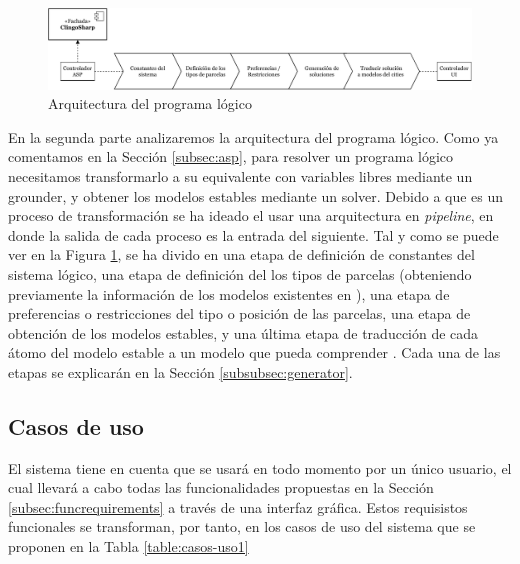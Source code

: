\begin{figure}[!h]
	\centering
	\includegraphics[width=\textwidth]{images/arquitectura-asp}
	\caption{Arquitectura del programa lógico}
	\label{fig:arquitectura-asp}
\end{figure}

En la segunda parte analizaremos la arquitectura del programa lógico. Como ya comentamos en la Sección \ref{subsec:asp}, para resolver un programa lógico necesitamos transformarlo a su equivalente con variables libres mediante un grounder, y obtener los modelos estables mediante un solver. Debido a que es un proceso de transformación se ha ideado el usar una arquitectura en \textit{pipeline}, en donde la salida de cada proceso es la entrada del siguiente. Tal y como se puede ver en la Figura \ref{fig:arquitectura-asp}, se ha divido en una etapa de definición de constantes del sistema lógico, una etapa de definición del los tipos de parcelas (obteniendo previamente la información de los modelos existentes en \cities), una etapa de preferencias o restricciones del tipo o posición de las parcelas, una etapa de obtención de los modelos estables, y una última etapa de traducción de cada átomo del modelo estable a un modelo que pueda comprender \cities. Cada una de las etapas se explicarán en la Sección \ref{subsubsec:generator}.

\subsection{Casos de uso}
\label{subsec:cases}

El sistema tiene en cuenta que se usará en todo momento por un único usuario, el cual llevará a cabo todas las funcionalidades propuestas en la Sección \ref{subsec:funcrequirements} a través de una interfaz gráfica. Estos requisistos funcionales se transforman, por tanto, en los casos de uso del sistema que se proponen en la Tabla \ref{table:casos-uso1}

